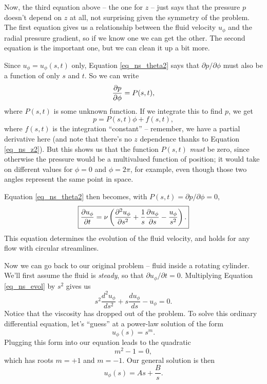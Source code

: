Now, the third equation above -- the one for $z$ -- just says that the pressure $p$ doesn't depend on $z$ at all, not surprising given the symmetry of the problem.  The first equation gives us a relationship between the fluid velocity $u_\phi$ and the radial pressure gradient, so if we know one we can get the other.  The second equation is the important one, but we can clean it up a bit more.  

Since $u_\phi = u_\phi(s, t)$ only, Equation \ref{eq_ns_theta2} says that $\partial p / \partial \phi$ must also be a function of only $s$ and $t$.  So we can write
\[
\frac{\partial {p}}{\partial {\phi}} = P(s, t),
\]
where $P(s, t)$ is some unknown function.  If we integrate this to find $p$, we get
\[
p = P(s, t) \phi + f(s, t),
\]
where $f(s, t)$ is the integration ``constant'' -- remember, we have a partial derivative here (and note that there's no $z$ dependence thanks to Equation \ref{eq_ns_z2}).  But this shows us that the function $P(s, t)$ \emph{must} be zero, since otherwise the pressure would be a multivalued function of position; it would take on different values for $\phi = 0$ and $\phi = 2 \pi$, for example, even though those two angles represent the same point in space.

Equation \ref{eq_ns_theta2} then becomes, with $P(s, t) = \partial p / \partial \phi = 0$, 
\begin{equation}
\label{eq_ns_evol}
\boxed{
\frac{\partial {u_\phi}}{\partial {t}} =  \nu \left( \frac{\partial^2 {u_\phi}}{\partial {s}^2} + \frac{1}{s} \frac{\partial {u_\phi}}{\partial {s}} - \frac{u_\phi}{s^2} \right).
}
\end{equation}
This equation determines the evolution of the fluid velocity, and holds for any flow with circular streamlines.

Now we can go back to our original problem -- fluid inside a rotating cylinder.  We'll first assume the fluid is \emph{steady}, so that $\partial u_\phi / \partial t = 0$.  Multiplying Equation \ref{eq_ns_evol} by $s^2$ gives us
\begin{equation}
\label{eq_spin_diffeq}
s^2 \frac{d^2 u_\phi}{ds^2} + s \frac{d u_\phi}{ds} - u_\phi = 0.
\end{equation}
Notice that the viscosity has dropped out of the problem.  To solve this ordinary differential equation, let's ``guess'' at a power-law solution of the form
\[
u_\phi(s) = s^m.
\]
Plugging this form into our equation leads to the quadratic 
\[
m^2 -1 = 0,
\]
which has roots $m = +1$ and $m = -1$.  Our general solution is then
\begin{equation}
\label{eq_cyl_steady_gen_sol}
u_\phi (s) = As + \frac{B}{s}.
\end{equation}

